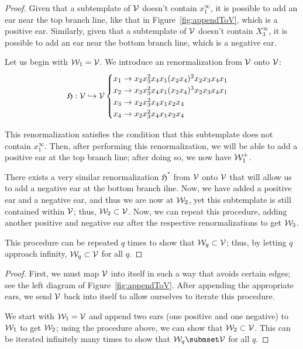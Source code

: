 \documentclass[paper.tex]{subfiles}
\begin{document}
\begin{proof}
    Given that a subtemplate of $\mathcal{V}$ doesn't contain $x_1^\infty$, it is possible to add an ear near the top branch line, like that in Figure~\ref{fig:appendToV}, which is a positive ear. Similarly, given that a subtemplate of $\mathcal{V}$ doesn't contain $X_3^\infty$, it is possible to add an ear near the bottom branch line, which is a negative ear. 

    Let us begin with $\mathcal{W}_1 = \mathcal{V}$. We introduce an renormalization from $\mathcal{V}$ onto $\mathcal{V}$: 
    $$\mathfrak{H}: \mathcal{V} \hookrightarrow \mathcal{V} \begin{cases}
        x_1 \rightarrow x_2 x_3^2 x_4 x_1 (x_2 x_4)^2 x_2 x_3 x_4 x_1 \\
        x_2 \rightarrow x_2 x_3^2 x_4 x_1 (x_2 x_4)^3 x_2 x_3 x_4 x_1 \\
        x_3 \rightarrow x_2 x_3^2 x_4 x_1  x_2 x_4  \\
        x_4 \rightarrow x_2 x_3^2 x_4 x_1  x_2 x_4  \end{cases} $$

        This renormalization satisfies the condition that this subtemplate does not contain $x_1^\infty$. Then, after performing this renormalization, we will be able to add a positive ear at the top branch line; after doing so, we now have $\mathcal{W}_1^+$. 

        There exists a very similar renormalization $\mathfrak{H}^*$ from $\mathcal{V}$ onto $\mathcal{V}$ that will allow us to add a negative ear at the bottom branch ilne. Now, we have added a positive ear and a negative ear, and thus we are now at $\mathcal{W}_2$, yet this subtemplate is still contained within $\mathcal{V}$; thus, $\mathcal{W}_2 \subset \mathcal{V}$. Now, we can repeat this procedure, adding another positive and negative ear after the respective renormalizations to get $\mathcal{W}_3$. 

        This procedure can be repeated $q$ times to show that $\mathcal{W}_q \subset \mathcal{V}$; thus, by letting $q$ approach infinity, $\mathcal{W}_q \subset \mathcal{V}$ for all $q$. 


    \end{proof}


\begin{proof}

    First, we must map $\mathcal{V}$ into itself in such a way that avoids certain edges; see the left diagram of Figure~\ref{fig:appendToV}. After appending the appropriate ears, we send $\mathcal{V}$ back into itself to allow ourselves to iterate this procedure. 

    We start with $\mathcal{W}_1 = \mathcal{V}$ and append two ears (one positive and one negative) to $\mathcal{W}_1$ to get $\mathcal{W}_2$; using the procedure above, we can show that $\mathcal{W}_2 \subset \mathcal{V}$. This can be iterated infinitely many times to show that $\W_q \submset \V$ for all $q$. 
\end{proof}
\end{document}
